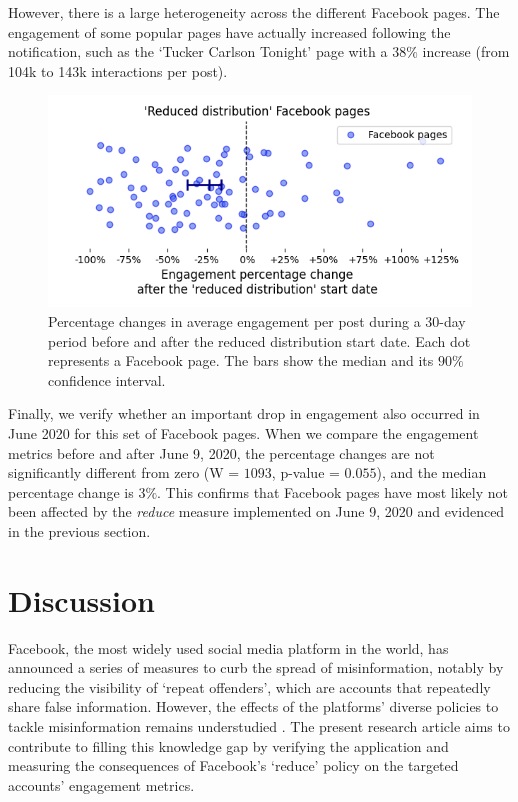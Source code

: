 \documentclass[11pt,a4paper]{article}
\begin{document}
However, there is a large heterogeneity across the different Facebook pages. The engagement of some popular pages have actually increased following the notification, such as the `Tucker Carlson Tonight' page with a $38\%$ increase (from 104k to 143k interactions per post).

\begin{figure}[!h]
\centering
\includegraphics[width=\linewidth]{./../figure/reduce_percentage_change.png}
\caption{
Percentage changes in average engagement per post during a 30-day period before and after the reduced distribution start date. 
Each dot represents a Facebook page. 
The bars show the median and its $90\%$ confidence interval.
}
\label{reduce_percentage_change}
\end{figure}
 
Finally, we verify whether an important drop in engagement also occurred in June 2020 for this set of Facebook pages.
When we compare the engagement metrics before and after June 9, 2020, the percentage changes are not significantly different from zero (W = $1093$, p-value = $0.055$), and the median percentage change is $3\%$.
This confirms that Facebook pages have most likely not been affected by the {\it reduce} measure implemented on June 9, 2020 and evidenced in the previous section.

\section{Discussion}

Facebook, the most widely used social media platform in the world, has announced a series of measures to curb the spread of misinformation, notably by reducing the visibility of `repeat offenders', which are accounts that repeatedly share false information. 
However, the effects of the platforms' diverse policies to tackle misinformation remains understudied \citep{pasquetto2020tackling}. 
The present research article aims to contribute to filling this knowledge gap by verifying the application and measuring the consequences of Facebook's `reduce' policy on the targeted accounts' engagement metrics.
\end{document}
